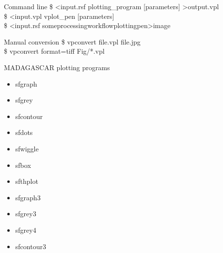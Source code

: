 \begin{frame}
  \begin{block}{Command line}
    \$ \textless input.rsf plotting\_program [parameters] \textgreater output.vpl \\
    \$ \textless input.vpl vplot\_pen [parameters] \\
    \$ \textless input.rsf some\textbar processing\textbar workflow\textbar plotting\textbar pen\textgreater image
  \end{block}

  \begin{block}{Manual conversion}
    \$ vpconvert file.vpl file.jpg \\
    \$ vpconvert format=tiff Fig/*.vpl
  \end{block}


  \begin{block}{MADAGASCAR plotting programs}
\vfill
    \begin{minipage}{0.4\textwidth}
    \begin{itemize}
      \item sfgraph
      \item sfgrey
      \item sfcontour
      \item sfdots
      \item sfwiggle
      \item sfbox
    \end{itemize}
    \end{minipage}
    \begin{minipage}{0.4\textwidth}
    \begin{itemize}
       \item sfthplot
       \item sfgraph3
      \item sfgrey3
      \item sfgrey4
      \item sfcontour3
    \end{itemize}
    \end{minipage}
  \end{block}
\end{frame}


